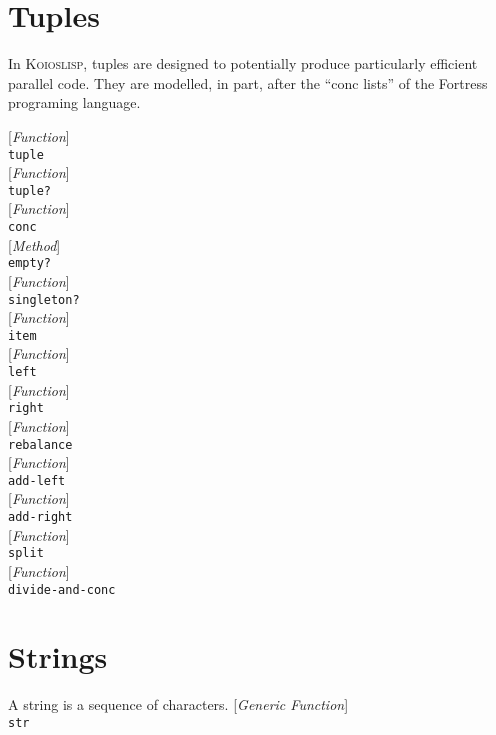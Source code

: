 \documentclass[10pt]{book}
\newenvironment{defother}[2]{[\textit{#1}]\\\texttt{#2}}{\\}
\newenvironment{defun}[1]{\begin{defother}{Function}{#1}}{\end{defother}}
\newenvironment{defgeneric}[1]{\begin{defother}{Generic Function}{#1}}{\end{defother}}
\newenvironment{defmethod}[1]{\begin{defother}{Method}{#1}}{\end{defother}}
\begin{document}
\chapter{Tuples}
In \textsc{Koioslisp}, tuples are designed to potentially produce particularly efficient parallel code. They are modelled, in part, after the ``conc lists'' %
of the Fortress programing language.



\begin{defun}{tuple}\end{defun}
\begin{defun}{tuple?}\end{defun}
\begin{defun}{conc}\end{defun}
\begin{defmethod}{empty?}\end{defmethod}
\begin{defun}{singleton?}\end{defun}
\begin{defun}{item}\end{defun}
\begin{defun}{left}\end{defun}
\begin{defun}{right}\end{defun}
\begin{defun}{rebalance}\end{defun} %
\begin{defun}{add-left}\end{defun}
\begin{defun}{add-right}\end{defun}
\begin{defun}{split}\end{defun}
\begin{defun}{divide-and-conc}\end{defun}

\chapter{Strings}
A string is a sequence of characters.
\begin{defgeneric}{str}\end{defgeneric} %
\end{document}
